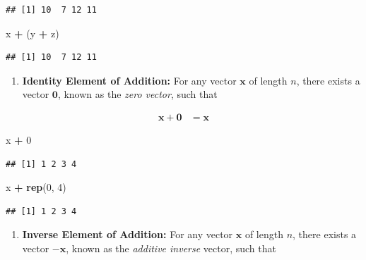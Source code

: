 \documentclass[
]{book}
\newenvironment{Shaded}{\begin{snugshade}}{\end{snugshade}}
\newcommand{\DecValTok}[1]{\textcolor[rgb]{0.00,0.00,0.81}{#1}}
\newcommand{\KeywordTok}[1]{\textcolor[rgb]{0.13,0.29,0.53}{\textbf{#1}}}
\newcommand{\NormalTok}[1]{#1}
\newcommand{\OperatorTok}[1]{\textcolor[rgb]{0.81,0.36,0.00}{\textbf{#1}}}
\newcommand{\StringTok}[1]{\textcolor[rgb]{0.31,0.60,0.02}{#1}}
\providecommand{\tightlist}{%
  \setlength{\itemsep}{0pt}\setlength{\parskip}{0pt}}
\theoremstyle{definition}
\theoremstyle{definition}
\theoremstyle{definition}
\theoremstyle{remark}
\begin{document}
\begin{verbatim}
## [1] 10  7 12 11
\end{verbatim}

\begin{Shaded}
\begin{Highlighting}[]
\NormalTok{x }\OperatorTok{+}\StringTok{ }\NormalTok{(y }\OperatorTok{+}\StringTok{ }\NormalTok{z)}
\end{Highlighting}
\end{Shaded}

\begin{verbatim}
## [1] 10  7 12 11
\end{verbatim}

\begin{enumerate}
\def\labelenumi{\arabic{enumi})}
\setcounter{enumi}{5}
\tightlist
\item
  \textbf{Identity Element of Addition:} For any vector \(\mathbf{x}\) of length \(n\), there exists a vector \(\mathbf{0}\), known as the \emph{zero vector}, such that
\end{enumerate}

\[
\begin{aligned}
\mathbf{x} + \mathbf{0} & = \mathbf{x}
\end{aligned}
\]

\begin{Shaded}
\begin{Highlighting}[]
\NormalTok{x }\OperatorTok{+}\StringTok{ }\DecValTok{0}
\end{Highlighting}
\end{Shaded}

\begin{verbatim}
## [1] 1 2 3 4
\end{verbatim}

\begin{Shaded}
\begin{Highlighting}[]
\NormalTok{x }\OperatorTok{+}\StringTok{ }\KeywordTok{rep}\NormalTok{(}\DecValTok{0}\NormalTok{, }\DecValTok{4}\NormalTok{)}
\end{Highlighting}
\end{Shaded}

\begin{verbatim}
## [1] 1 2 3 4
\end{verbatim}

\begin{enumerate}
\def\labelenumi{\arabic{enumi})}
\setcounter{enumi}{6}
\tightlist
\item
  \textbf{Inverse Element of Addition:} For any vector \(\mathbf{x}\) of length \(n\), there exists a vector \(-\mathbf{x}\), known as the \emph{additive inverse} vector, such that
\end{enumerate}
\end{document}
